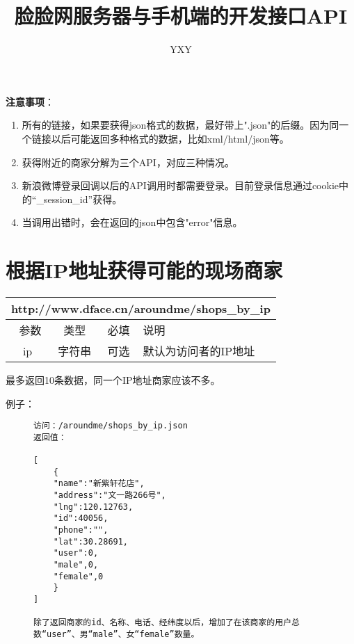 \documentclass[cs4size]{ctexartutf8}
\author{YXY}
\title{脸脸网服务器与手机端的开发接口API}
\begin{document}
 

\maketitle
\tableofcontents

\newpage

\textbf{注意事项}：
\begin{enumerate}
\item 所有的链接，如果要获得json格式的数据，最好带上".json"的后缀。因为同一个链接以后可能返回多种格式的数据，比如xml/html/json等。
\item 获得附近的商家分解为三个API，对应三种情况。
\item 新浪微博登录回调以后的API调用时都需要登录。目前登录信息通过cookie中的“\_session\_id”获得。
\item 当调用出错时，会在返回的json中包含"error"信息。
\end{enumerate}

\newpage


\section{根据IP地址获得可能的现场商家}

\begin{table}[H]
   \begin{center}
\begin{tabular}{|c|c|c|p{12cm}|}
\hline
\multicolumn{4}{|c|}{http://www.dface.cn/aroundme/shops\_by\_ip} \\
\hline\hline
 \  参数  & 类型 & 必填 &  说明  \\
\hline
 ip  & 字符串 & 可选 & 默认为访问者的IP地址\\
\hline
\end{tabular}
   \end{center}
\end{table}


最多返回10条数据，同一个IP地址商家应该不多。

例子：

\begin{figure}[H]
\begin{verbatim}
访问：/aroundme/shops_by_ip.json
返回值：

[
	{
	"name":"新紫轩花店",
	"address":"文一路266号",
	"lng":120.12763,
	"id":40056,
	"phone":"",
	"lat":30.28691,
	"user":0,
	"male",0,
	"female",0
	}
]

除了返回商家的id、名称、电话、经纬度以后，增加了在该商家的用户总数“user”、男“male”、女“female”数量。

\end{verbatim}
\end{figure}
\end{document}

